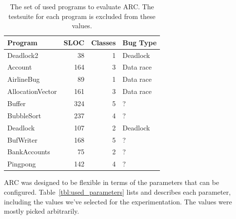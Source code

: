 \documentclass[10pt, conference, compsocconf]{IEEEtran}
\begin{document}
\begin{table}[!h]
\begin{center}
\begin{tabular}{|l|r|r|l|}
\hline
\textbf{Program} &
\textbf{SLOC} &
\textbf{Classes} &
\textbf{Bug Type}
\\\hline
Deadlock2 & 38 & 1 & Deadlock
\\\hline
Account & 164 & 3 & Data race
\\\hline
AirlineBug & 89 & 1 & Data race
\\\hline
AllocationVector & 161 & 3 & Data race
\\\hline
Buffer & 324 & 5 & ?
\\\hline
BubbleSort & 237 & 4 & ?
\\\hline
Deadlock & 107 & 2 & Deadlock
\\\hline
BufWriter& 168 & 5 & ?
\\\hline
BankAccounts & 75 & 2 & ?
\\\hline
Pingpong & 142 & 4 & ?
\\\hline
\end{tabular}
\caption{The set of used programs to evaluate ARC. The testsuite for each
program is excluded from these values.}
\label{tbl:used_programs}
\end{center}
\end{table}

ARC was designed to be flexible in terms of the parameters that can be
configured. Table~\ref{tbl:used_parameters} lists and describes each parameter,
including the values we've selected for the experimentation. The values were
mostly picked arbitrarily.
\end{document}
